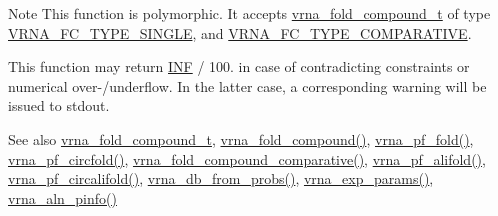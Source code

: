 \begin{DoxyNote}{Note}
This function is polymorphic. It accepts \hyperlink{group__fold__compound_ga1b0cef17fd40466cef5968eaeeff6166}{vrna\+\_\+fold\+\_\+compound\+\_\+t} of type \hyperlink{group__fold__compound_gga01a4ff86fa71deaaa5d1abbd95a1447da7e264dd3cf2dc9b6448caabcb7763cd6}{V\+R\+N\+A\+\_\+\+F\+C\+\_\+\+T\+Y\+P\+E\+\_\+\+S\+I\+N\+G\+LE}, and \hyperlink{group__fold__compound_gga01a4ff86fa71deaaa5d1abbd95a1447dab821ce46ea3cf665be97df22a76f5023}{V\+R\+N\+A\+\_\+\+F\+C\+\_\+\+T\+Y\+P\+E\+\_\+\+C\+O\+M\+P\+A\+R\+A\+T\+I\+VE}.

This function may return \hyperlink{constants_8h_a12c2040f25d8e3a7b9e1c2024c618cb6}{I\+NF} / 100. in case of contradicting constraints or numerical over-\//underflow. In the latter case, a corresponding warning will be issued to {\ttfamily stdout}.
\end{DoxyNote}
\begin{DoxySeeAlso}{See also}
\hyperlink{group__fold__compound_ga1b0cef17fd40466cef5968eaeeff6166}{vrna\+\_\+fold\+\_\+compound\+\_\+t}, \hyperlink{group__fold__compound_ga6601d994ba32b11511b36f68b08403be}{vrna\+\_\+fold\+\_\+compound()}, \hyperlink{group__part__func__global_gac4a2a74a79e49818bc35412a2b392c7e}{vrna\+\_\+pf\+\_\+fold()}, \hyperlink{group__part__func__global_ga87e5a77b6e50dd54e9d032a9b92973be}{vrna\+\_\+pf\+\_\+circfold()}, \hyperlink{group__fold__compound_gad6bacc816af274922b13d947f708aa0c}{vrna\+\_\+fold\+\_\+compound\+\_\+comparative()}, \hyperlink{group__part__func__global_ga374e31a0f326b2c5da5b84e143a63f38}{vrna\+\_\+pf\+\_\+alifold()}, \hyperlink{group__part__func__global_gab70fe6c9a78b79cc5669881720926e1d}{vrna\+\_\+pf\+\_\+circalifold()}, \hyperlink{group__struct__utils_ga0c28c410a5ab22d6ab9c77a84e8d5b44}{vrna\+\_\+db\+\_\+from\+\_\+probs()}, \hyperlink{group__energy__parameters_gab1f3016f96aa96bff020cdd904605afa}{vrna\+\_\+exp\+\_\+params()}, \hyperlink{group__aln__utils_gaf6421a1318586c59fea6a127ed9f65f3}{vrna\+\_\+aln\+\_\+pinfo()}
\end{DoxySeeAlso}

